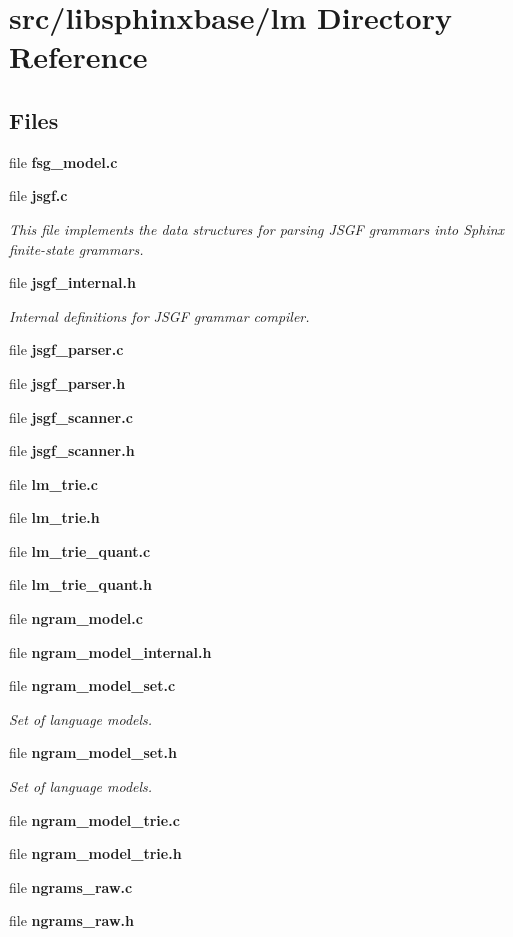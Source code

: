 \section{src/libsphinxbase/lm Directory Reference}
\label{dir_60aae0458aa1ecc8feb93296b73d98ea}
\subsection*{Files}
\begin{DoxyCompactItemize}
\item 
file {\bfseries fsg\-\_\-model.\-c}
\item 
file {\bf jsgf.\-c}
\begin{DoxyCompactList}\small\item\em This file implements the data structures for parsing J\-S\-G\-F grammars into Sphinx finite-\/state grammars. \end{DoxyCompactList}\item 
file {\bf jsgf\-\_\-internal.\-h}
\begin{DoxyCompactList}\small\item\em Internal definitions for J\-S\-G\-F grammar compiler. \end{DoxyCompactList}\item 
file {\bfseries jsgf\-\_\-parser.\-c}
\item 
file {\bfseries jsgf\-\_\-parser.\-h}
\item 
file {\bfseries jsgf\-\_\-scanner.\-c}
\item 
file {\bfseries jsgf\-\_\-scanner.\-h}
\item 
file {\bfseries lm\-\_\-trie.\-c}
\item 
file {\bfseries lm\-\_\-trie.\-h}
\item 
file {\bfseries lm\-\_\-trie\-\_\-quant.\-c}
\item 
file {\bfseries lm\-\_\-trie\-\_\-quant.\-h}
\item 
file {\bfseries ngram\-\_\-model.\-c}
\item 
file {\bfseries ngram\-\_\-model\-\_\-internal.\-h}
\item 
file {\bf ngram\-\_\-model\-\_\-set.\-c}
\begin{DoxyCompactList}\small\item\em Set of language models. \end{DoxyCompactList}\item 
file {\bf ngram\-\_\-model\-\_\-set.\-h}
\begin{DoxyCompactList}\small\item\em Set of language models. \end{DoxyCompactList}\item 
file {\bfseries ngram\-\_\-model\-\_\-trie.\-c}
\item 
file {\bfseries ngram\-\_\-model\-\_\-trie.\-h}
\item 
file {\bfseries ngrams\-\_\-raw.\-c}
\item 
file {\bfseries ngrams\-\_\-raw.\-h}
\end{DoxyCompactItemize}
